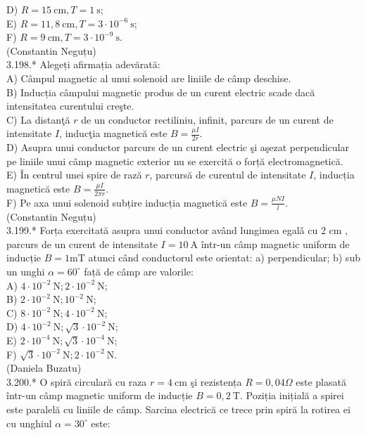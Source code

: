 \documentclass[10pt]{article}
\begin{document}
D) $R=15 \mathrm{~cm}, T=1 \mathrm{~s}$;\\
E) $R=11,8 \mathrm{~cm}, T=3 \cdot 10^{-6} \mathrm{~s}$;\\
F) $R=9 \mathrm{~cm}, T=3 \cdot 10^{-9} \mathrm{~s}$.\\
(Constantin Neguțu)\\
3.198.* Alegeți afirmația adevărată:\\
A) Câmpul magnetic al unui solenoid are liniile de câmp deschise.\\
B) Inducția câmpului magnetic produs de un curent electric scade dacă intensitatea curentului creşte.\\
C) La distanţă $r$ de un conductor rectiliniu, infinit, parcurs de un curent de intensitate $I$, inducţia magnetică este $B=\frac{\mu I}{2 r}$.\\
D) Asupra unui conductor parcurs de un curent electric şi aşezat perpendicular pe liniile unui câmp magnetic exterior nu se exercită o forță electromagnetică.\\
E) În centrul unei spire de rază $r$, parcursă de curentul de intensitate $I$, inducția magnetică este $B=\frac{\mu I}{2 \pi r}$.\\
F) Pe axa unui solenoid subțire inducția magnetică este $B=\frac{\mu N I}{l}$.\\
(Constantin Neguțu)\\
3.199.* Forța exercitată asupra unui conductor având lungimea egalǎ cu 2 cm , parcurs de un curent de intensitate $I=10 \mathrm{~A}$ într-un câmp magnetic uniform de inducție $B=1 \mathrm{mT}$ atunci când conductorul este orientat: a) perpendicular; b) sub un unghi $\alpha=60^{\circ}$ față de câmp are valorile:\\
A) $4 \cdot 10^{-2} \mathrm{~N} ; 2 \cdot 10^{-2} \mathrm{~N}$;\\
B) $2 \cdot 10^{-2} \mathrm{~N} ; 10^{-2} \mathrm{~N}$;\\
C) $8 \cdot 10^{-2} \mathrm{~N} ; 4 \cdot 10^{-2} \mathrm{~N}$;\\
D) $4 \cdot 10^{-2} \mathrm{~N} ; \sqrt{3} \cdot 10^{-2} \mathrm{~N}$;\\
E) $2 \cdot 10^{-4} \mathrm{~N} ; \sqrt{3} \cdot 10^{-4} \mathrm{~N}$;\\
F) $\sqrt{3} \cdot 10^{-2} \mathrm{~N} ; 2 \cdot 10^{-2} \mathrm{~N}$.\\
(Daniela Buzatu)\\
3.200.* O spiră circulară cu raza $r=4 \mathrm{~cm}$ şi rezistența $R=0,04 \Omega$ este plasată într-un câmp magnetic uniform de inducție $B=0,2 \mathrm{~T}$. Poziția inițială a spirei este paralelă cu liniile de câmp. Sarcina electrică ce trece prin spiră la rotirea ei cu unghiul $\alpha=30^{\circ}$ este:\\
\end{document}
